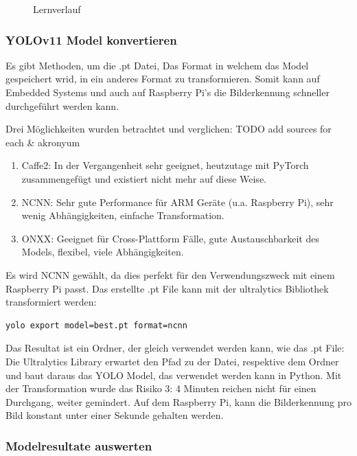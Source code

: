 \begin{figure}[H]
\begin{minipage}[b]{0.3\textwidth}
    \caption{Lernverlauf}
    \label{fig:results-lernverlauf}
  \end{minipage}
\end{figure}

\subsubsection{YOLOv11 Model konvertieren}
\label{convert-yolo}

Es gibt Methoden, um die .pt Datei, Das Format in welchem das Model gespeichert wrid, in ein anderes Format zu transformieren. Somit kann auf Embedded Systems und auch auf Raspberry Pi's die Bilderkennung schneller durchgeführt werden kann.

Drei Möglichkeiten wurden betrachtet und verglichen:
TODO add sources for each \& akronyum
\begin{enumerate}
    \item Caffe2: In der Vergangenheit sehr geeignet, heutzutage mit PyTorch zusammengefügt und existiert nicht mehr auf diese Weise.
    \item NCNN: Sehr gute Performance für ARM Geräte (u.a. Raspberry Pi), sehr wenig Abhängigkeiten, einfache Transformation.
    \item ONXX: Geeignet für  Cross-Plattform Fälle, gute Austauschbarkeit des Models, flexibel, viele Abhängigkeiten.
\end{enumerate}

Es wird NCNN gewählt, da dies perfekt für den Verwendungszweck mit einem Raspberry Pi passt. Das erstellte .pt File kann mit der ultralytics Bibliothek transformiert werden:

\begin{verbatim}
yolo export model=best.pt format=ncnn
\end{verbatim}

Das Resultat ist ein Ordner, der gleich verwendet werden kann, wie das .pt File: Die Ultralytics Library erwartet den Pfad zu der Datei, respektive dem Ordner und baut daraus das YOLO Model, das verwendet werden kann in Python. Mit der Transformation wurde das Risiko 3: 4 Minuten reichen nicht für einen Durchgang, weiter gemindert. Auf dem Raspberry Pi, kann die Bilderkennung pro Bild konstant unter einer Sekunde gehalten werden.

\subsubsection{Modelresultate auswerten}
\label{model-results}

